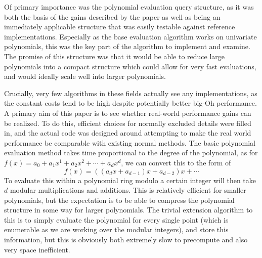 \documentclass[pageno]{jpaper}
\begin{document}
Of primary importance was the polynomial evaluation query structure, as it was both the basis of the gains described by the paper as well as being an immediately applicable structure that was easily testable against reference implementations.
Especially as the base evaluation algorithm works on univariate polynomials, this was the key part of the algorithm to implement and examine.
The promise of this structure was that it would be able to reduce large polynomials into a compact structure which could allow for very fast evaluations, and would ideally scale well into larger polynomials.

Crucially, very few algorithms in these fields actually see any implementations, as the constant costs tend to be high despite potentially better big-Oh performance.
A primary aim of this paper is to see whether real-world performance gains can be realized.
To do this, efficient choices for normally excluded details were filled in, and the actual code was designed around attempting to make the real world performance be comparable with existing normal methods.
The basic polynomial evaluation method takes time proportional to the degree of the polynomial, as for $f(x) = a_0 + a_1x^1 + a_2x^2 + \cdots + a_dx^d$, we can convert this to the form of 
\[f(x) = \left(\left(a_dx+a_{d-1}\right)x + a_{d-2}\right)x + \cdots\]
To evaluate this within a polynomial ring modulo a certain integer will then take $d$ modular multiplications and additions.
This is relatively efficient for smaller polynomials, but the expectation is to be able to compress the polynomial structure in some way for larger polynomials.
The trivial extension algorithm to this is to simply evaluate the polynomial for every single point (which is enumerable as we are working over the modular integers), and store this information, but this is obviously both extremely slow to precompute and also very space inefficient.
\end{document}
